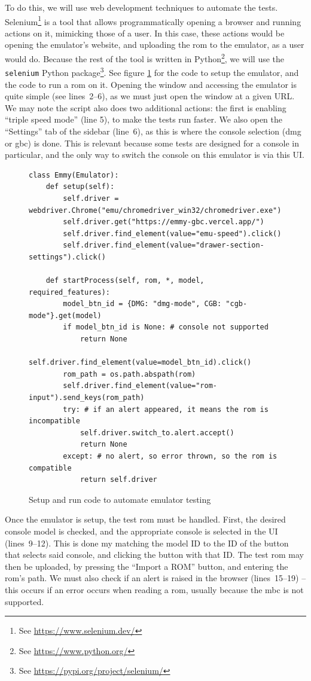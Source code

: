 \documentclass[11pt]{informatics-report}
\newcommand{\ftnt}[1]{\footnote{See \url{#1}}}
\begin{document}
To do this, we will use web development techniques to automate the tests. Selenium\ftnt{https://www.selenium.dev/} is a tool that allows programmatically opening a browser and running actions on it, mimicking those of a user. In this case, these actions would be opening the emulator's website, and uploading the \gls{rom} to the emulator, as a user would do. Because the rest of the tool is written in Python\ftnt{https://www.python.org/}, we will use the \texttt{selenium} Python package\ftnt{https://pypi.org/project/selenium/}. See figure \ref{fig:selenium-testing} for the code to setup the emulator, and the code to run a \gls{rom} on it. Opening the window and accessing the emulator is quite simple (see lines~2--6), as we must just open the window at a given URL. We may note the script also does two additional actions: the first is enabling ``triple speed mode'' (line 5), to make the tests run faster. We also open the ``Settings'' tab of the sidebar (line~6), as this is where the console selection (\gls{dmg} or \gls{gbc}) is done. This is relevant because some tests are designed for a console in particular, and the only way to switch the console on this emulator is via this UI.

\begin{figure}[h]
    \begin{verbatim}
class Emmy(Emulator):
    def setup(self):
        self.driver = webdriver.Chrome("emu/chromedriver_win32/chromedriver.exe")
        self.driver.get("https://emmy-gbc.vercel.app/")
        self.driver.find_element(value="emu-speed").click()
        self.driver.find_element(value="drawer-section-settings").click()

    def startProcess(self, rom, *, model, required_features):
        model_btn_id = {DMG: "dmg-mode", CGB: "cgb-mode"}.get(model)
        if model_btn_id is None: # console not supported
            return None
        self.driver.find_element(value=model_btn_id).click()
        rom_path = os.path.abspath(rom)
        self.driver.find_element(value="rom-input").send_keys(rom_path)
        try: # if an alert appeared, it means the rom is incompatible
            self.driver.switch_to.alert.accept()
            return None
        except: # no alert, so error thrown, so the rom is compatible
            return self.driver
    \end{verbatim}
    \caption{Setup and run code to automate emulator testing}
    \label{fig:selenium-testing}
\end{figure}

Once the emulator is setup, the test \gls{rom} must be handled. First, the desired console model is checked, and the appropriate console is selected in the UI (lines~9--12). This is done my matching the model ID to the ID of the button that selects said console, and clicking the button with that ID. The test \gls{rom} may then be uploaded, by pressing the ``Import a ROM'' button, and entering the \gls{rom}'s path. We must also check if an alert is raised in the browser (lines~15--19) -- this occurs if an error occurs when reading a \gls{rom}, usually because the \gls{mbc} is not supported.
\end{document}
